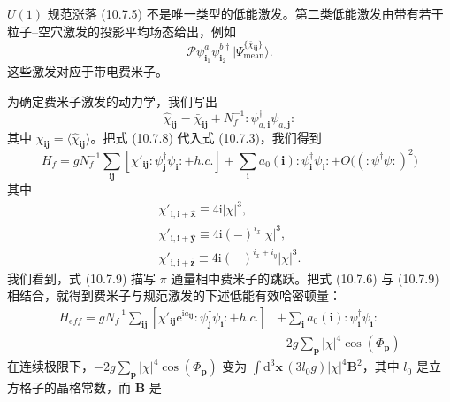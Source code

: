 $U(1)$ 规范涨落 (10.7.5) 不是唯一类型的低能激发。第二类低能激发由带有若干粒子--空穴激发的投影平均场态给出，例如
\begin{equation*}
\mathcal P\psi^{a}_{\pmb i_1}\psi^{b\dagger}_{\pmb i_2}|\Psi^{\{\bar\chi_{\pmb i\pmb j}\}}_{\mathrm{mean}}\rangle.\tag{10.7.7}
\end{equation*}
这些激发对应于带电费米子。

为确定费米子激发的动力学，我们写出
\begin{equation*}
\hat\chi_{\pmb i\pmb j}=\bar\chi_{\pmb i\pmb j}+N_f^{-1}:\psi^{\dagger}_{a,\pmb i}\psi_{a,\pmb j}:\tag{10.7.8}
\end{equation*}
其中 $\bar\chi_{\pmb i\pmb j}=\langle\hat\chi_{\pmb i\pmb j}\rangle$。把式 (10.7.8) 代入式 (10.7.3)，我们得到
\begin{equation*}
H_f=gN_f^{-1}\sum_{\pmb i\pmb j}[\chi'_{\pmb i\pmb j}:\psi^{\dagger}_{\pmb j}\psi_{\pmb i}:+h.c.]+\sum_{\pmb i}a_0(\pmb i):\psi^{\dagger}_{\pmb i}\psi_{\pmb i}:+O\big((:\psi^{\dagger}\psi:)^{2}\big)\tag{10.7.9}
\end{equation*}
其中
\begin{gather*}
\chi'_{\pmb i,\pmb i+\hat{\pmb x}}\equiv4\mathrm{i}|\chi|^{3},\\
\chi'_{\pmb i,\pmb i+\hat{\pmb y}}\equiv4\mathrm{i}(-)^{i_x}|\chi|^{3},\\
\chi'_{\pmb i,\pmb i+\hat{\pmb z}}\equiv4\mathrm{i}(-)^{i_x+i_y}|\chi|^{3}.\tag{10.7.10}
\end{gather*}
我们看到，式 (10.7.9) 描写 $\pi$ 通量相中费米子的跳跃。把式 (10.7.6) 与 (10.7.9) 相结合，就得到费米子与规范激发的下述低能有效哈密顿量：
\begin{align*}
H_{eff}=gN_f^{-1}\sum_{\pmb i\pmb j}[\chi'_{\pmb i\pmb j}\mathrm{e}^{\mathrm{i}a_{\pmb i\pmb j}}:\psi^{\dagger}_{\pmb j}\psi_{\pmb i}:+h.c.]&+\sum_{\pmb i}a_0(\pmb i):\psi^{\dagger}_{\pmb i}\psi_{\pmb i}:\\
&-2g\sum_{\pmb p}|\chi|^{4}\cos(\Phi_{\pmb p})\tag{10.7.11}
\end{align*}
在连续极限下，$-2g\sum_{\pmb p}|\chi|^{4}\cos(\Phi_{\pmb p})$ 变为 $\int\mathrm{d}^{3}\pmb x\,(3l_0 g)|\chi|^{4}\pmb B^{2}$，其中 $l_0$ 是立方格子的晶格常数，而 $\pmb B$ 是
